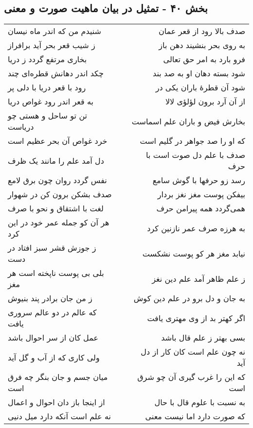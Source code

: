 \begin{center}
\section*{بخش ۴۰ - تمثیل در بیان ماهیت صورت و معنی}
\label{sec:sh040}
\begin{longtable}{l p{0.5cm} r}
شنیدم من که اندر ماه نیسان
&&
صدف بالا رود از قعر عمان
\\
ز شیب قعر بحر آید برافراز
&&
به روی بحر بنشیند دهن باز
\\
بخاری مرتفع گردد ز دریا
&&
فرو بارد به امر حق تعالی
\\
چکد اندر دهانش قطره‌ای چند
&&
شود بسته دهان او به صد بند
\\
رود با قعر دریا با دلی پر
&&
شود آن قطرهٔ باران یکی در
\\
به قعر اندر رود غواص دریا
&&
از آن آرد برون لؤلؤی لالا
\\
تن تو ساحل و هستی چو دریاست
&&
بخارش فیض و باران علم اسماست
\\
خرد غواص آن بحر عظیم است
&&
که او را صد جواهر در گلیم است
\\
دل آمد علم را مانند یک ظرف
&&
صدف با علم دل صوت است با حرف
\\
نفس گردد روان چون برق لامع
&&
رسد زو حرفها با گوش سامع
\\
صدف بشکن برون کن در شهوار
&&
بیفکن پوست مغز نغز بردار
\\
لغت با اشتقاق و نحو با صرف
&&
همی‌گردد همه پیرامن حرف
\\
هر آن کو جمله عمر خود در این کرد
&&
به هرزه صرف عمر نازنین کرد
\\
ز جوزش قشر سبز افتاد در دست
&&
نیابد مغز هر کو پوست نشکست
\\
بلی بی پوست ناپخته است هر مغز
&&
ز علم ظاهر آمد علم دین نغز
\\
ز من جان برادر پند بنیوش
&&
به جان و دل برو در علم دین کوش
\\
که عالم در دو عالم سروری یافت
&&
اگر کهتر بد از وی مهتری یافت
\\
عمل کان از سر احوال باشد
&&
بسی بهتر ز علم قال باشد
\\
ولی کاری که از آب و گل آید
&&
نه چون علم است کان کار از دل آید
\\
میان جسم و جان بنگر چه فرق است
&&
که این را غرب گیری آن چو شرق است
\\
از اینجا باز دان احوال و اعمال
&&
به نسبت با علوم قال با حال
\\
نه علم است آنکه دارد میل دنیی
&&
که صورت دارد اما نیست معنی
\\

\end{longtable}
\end{center}
